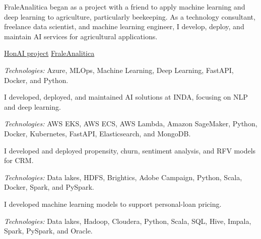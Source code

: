 \documentclass[11pt,a4paper,roman]{moderncv}        %
\begin{document}
FraleAnalitica began as a project with a friend to apply machine learning and deep learning to agriculture, particularly beekeeping. As a technology consultant, freelance data scientist, and machine learning engineer, I develop, deploy, and maintain AI services for agricultural applications.

\href{https://opertifelipe.github.io/projects/honai/}{HonAI project} \quad \href{https://www.fraleanalitica.it/}{FraleAnalitica}

\vspace{1pt}
\textit{Technologies:} Azure, MLOps, Machine Learning, Deep Learning, FastAPI, Docker, and Python.

\vspace{10pt}


I developed, deployed, and maintained AI solutions at INDA, focusing on NLP and deep learning.

\vspace{1pt}
\textit{Technologies:} AWS EKS, AWS ECS, AWS Lambda, Amazon SageMaker, Python, Docker, Kubernetes, FastAPI, Elasticsearch, and MongoDB.

\vspace{10pt}

I developed and deployed propensity, churn, sentiment analysis, and RFV models for CRM.

\vspace{1pt}
\textit{Technologies:} Data lakes, HDFS, Brightics, Adobe Campaign, Python, Scala, Docker, Spark, and PySpark.

\vspace{10pt}


I developed machine learning models to support personal-loan pricing.

\vspace{1pt}
\textit{Technologies:} Data lakes, Hadoop, Cloudera, Python, Scala, SQL, Hive, Impala, Spark, PySpark, and Oracle.

\vspace{10pt}
\end{document}

